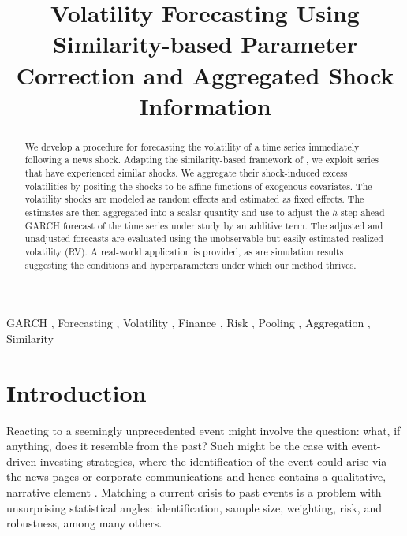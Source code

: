\documentclass[11pt,3p,review,authoryear]{elsarticle}
\theoremstyle{definition}
\begin{document}
\begin{frontmatter}

\title{Volatility Forecasting Using Similarity-based Parameter Correction and Aggregated Shock Information}

\begin{abstract}
  We develop a procedure for forecasting the volatility of a time series immediately following a news shock.  Adapting the similarity-based framework of \citet{lin2021minimizing}, we exploit series that have experienced similar shocks.  We aggregate their shock-induced excess volatilities by positing the shocks to be affine functions of exogenous covariates.  The volatility shocks are modeled as random effects and estimated as fixed effects.  The estimates are then aggregated into a scalar quantity and use to adjust the $h$-step-ahead GARCH forecast of the time series under study by an additive term.  The adjusted and unadjusted forecasts are evaluated using the unobservable but easily-estimated realized volatility (RV).  A real-world application is provided, as are simulation results suggesting the conditions and hyperparameters under which our method thrives.
\end{abstract}

\begin{keyword}
  GARCH \sep 
 Forecasting \sep 
 Volatility \sep 
Finance \sep
Risk \sep
Pooling \sep
Aggregation \sep
Similarity
\end{keyword}

\end{frontmatter}

\section{Introduction}

Reacting to a seemingly unprecedented event might involve the question: what, if anything, does it resemble from the past?  Such might be the case with event-driven investing strategies, where the identification of the event could arise via the news pages or corporate communications and hence contains a qualitative, narrative element \citep{Kenton}.  Matching a current crisis to past events is a problem with unsurprising statistical angles: identification, sample size, weighting, risk, and robustness, among many others.  
\end{document}
